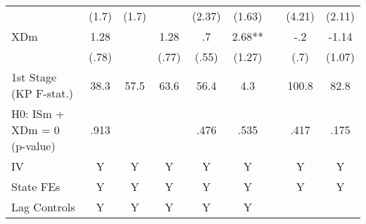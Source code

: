 \begin{center}
\begin{table}[h!]
\begin{center}
\begin{centering}
\begin{tabular}{lcccccc|cc}
                                         & {\scriptsize{}(1.7)}  & {\scriptsize{}(1.7)}  & & {\scriptsize{}(2.37)}  & {\scriptsize{}(1.63)}  & & {\scriptsize{}(4.21)}  & {\scriptsize{}(2.11)}  \tabularnewline
{\footnotesize{}XDm} & {\footnotesize{} 1.28} & & {\footnotesize{} 1.28} & {\footnotesize{} .7} & {\footnotesize{} 2.68**} & & {\footnotesize{} -.2} & {\footnotesize{} -1.14} \tabularnewline
                                         & {\scriptsize{}(.78)}  & & {\scriptsize{}(.77)}  & {\scriptsize{}(.55)}  & {\scriptsize{}(1.27)}  & & {\scriptsize{}(.7)}  & {\scriptsize{}(1.07)}  \tabularnewline
{\scriptsize{}1st Stage (KP F-stat.)}      & {\scriptsize{} 38.3} & {\scriptsize{} 57.5}& {\scriptsize{} 63.6} & {\scriptsize{} 56.4} & {\scriptsize{} 4.3} & & {\scriptsize{} 100.8} & {\scriptsize{} 82.8} \tabularnewline
{\scriptsize{}H0: ISm + XDm = 0 (p-value)} & {\scriptsize{} .913}  & {\scriptsize{} } & {\scriptsize{} } & {\scriptsize{} .476} & {\scriptsize{} .535} & & {\scriptsize{} .417} & {\scriptsize{} .175} \tabularnewline
\hline 
{\scriptsize{}IV}           & {\scriptsize{}Y} & {\scriptsize{}Y} & {\scriptsize{}Y} & {\scriptsize{}Y} & {\scriptsize{}Y} & & {\scriptsize{}Y} & {\scriptsize{}Y} \tabularnewline
{\scriptsize{}State FEs}    & {\scriptsize{}Y} & {\scriptsize{}Y} & {\scriptsize{}Y} & {\scriptsize{}Y} & {\scriptsize{}Y} & & {\scriptsize{}Y} & {\scriptsize{}Y} \tabularnewline
{\scriptsize{}Lag Controls} & {\scriptsize{}Y} & {\scriptsize{}Y} & {\scriptsize{}Y} & {\scriptsize{}Y} & {\scriptsize{}Y} & & &  \tabularnewline
\hline 
\end{tabular}
\par\end{centering}
\medskip
\end{center}
\footnotesize

\end{table}
\end{center}
